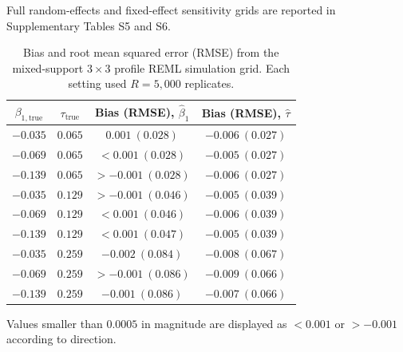 \documentclass[journal=rsm]{CUP-JNL-DTM}%
\theoremstyle{definition}
\numberwithin{equation}{section}
\begin{document}
\noindent Full random-effects and fixed-effect sensitivity grids are reported in
Supplementary Tables S5 and S6.


\begin{table}[htbp]
\centering
\caption{Bias and root mean squared error (RMSE) from the mixed-support $3\times3$ profile REML simulation grid. Each setting used $R=5{,}000$ replicates.}
\label{tab:simgrid}
\begin{tabular}{cccc}
\toprule
$\beta_{1,\mathrm{true}}$ & $\tau_{\mathrm{true}}$ & Bias (RMSE), $\hat\beta_1$ & Bias (RMSE), $\hat\tau$ \\
\midrule
$-0.035$ & $0.065$ & $0.001\ (0.028)$ & $-0.006\ (0.027)$ \\
$-0.069$ & $0.065$ & $<0.001\ (0.028)$ & $-0.005\ (0.027)$ \\
$-0.139$ & $0.065$ & $>-0.001\ (0.028)$ & $-0.006\ (0.027)$ \\
$-0.035$ & $0.129$ & $>-0.001\ (0.046)$ & $-0.005\ (0.039)$ \\
$-0.069$ & $0.129$ & $<0.001\ (0.046)$ & $-0.006\ (0.039)$ \\
$-0.139$ & $0.129$ & $<0.001\ (0.047)$ & $-0.005\ (0.039)$ \\
$-0.035$ & $0.259$ & $-0.002\ (0.084)$ & $-0.008\ (0.067)$ \\
$-0.069$ & $0.259$ & $>-0.001\ (0.086)$ & $-0.009\ (0.066)$ \\
$-0.139$ & $0.259$ & $-0.001\ (0.086)$ & $-0.007\ (0.066)$ \\
\bottomrule
\end{tabular}
\par\smallskip
{\footnotesize Values smaller than $0.0005$ in magnitude are displayed as
$<0.001$ or $>-0.001$ according to direction.}
\end{table}
\end{document}
